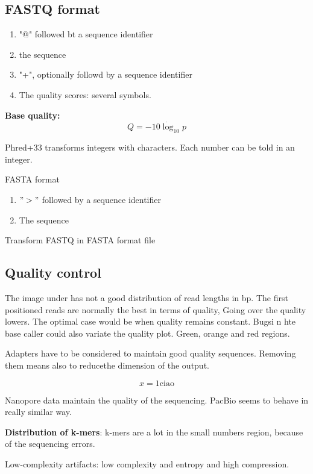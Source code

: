 \subsection{FASTQ format}
\begin{enumerate}
\item "@" followed bt a sequence identifier
\item the sequence
\item "+", optionally followd by a sequence identifier
\item The quality scores: several symbols.
\end{enumerate}


\textbf{Base quality:
}
$$ Q = -10 \dot \log_10{p} $$ 


Phred+33 transforms integers with characters. Each number can be told in an integer.




FASTA format

\begin{enumerate}
\item $">"$ followed by a sequence identifier
\item The sequence
\end{enumerate}


Transform FASTQ in FASTA format file

\subsection{Quality control}
The image under has not a good distribution of read lengths in bp. The first positioned reads are normally the best in terms of quality, Going over the quality lowers. The optimal case would be when quality remains constant. Bugsi n hte base caller could also variate the quality plot. Green, orange and red regions.

Adapters have to be considered to maintain good quality sequences. Removing them means also to reducethe dimension of the output.

$$ x = 1 \text{ciao}$$


Nanopore data maintain the quality of the sequencing.
PacBio seems to behave in really similar way.


\textbf{Distribution of k-mers}: k-mers are a lot in the small numbers region, because of the sequencing errors.


Low-complexity artifacts: low complexity and entropy and high compression.
